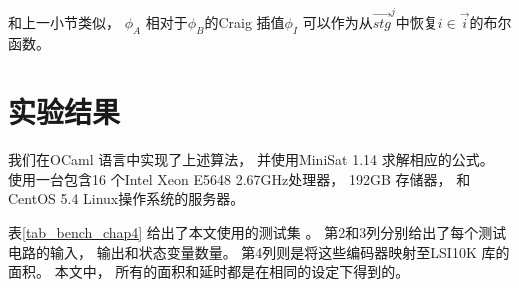 和上一小节类似，
$\phi_A$ 相对于$\phi_B$的Craig 插值$\phi_I$
可以作为从$\vec{stg}^j$中恢复$i\in\vec{i}$的布尔函数。



\section{实验结果}\label{sec_exp_chap4}
我们在OCaml 语言中实现了上述算法，
并使用MiniSat 1.14 求解相应的公式。
使用一台包含16 个Intel Xeon E5648 2.67GHz处理器，
192GB 存储器， 和CentOS 5.4 Linux操作系统的服务器。

表\ref{tab_bench_chap4} 给出了本文使用的测试集 。
第2和3列分别给出了每个测试电路的输入， 输出和状态变量数量。
第4列则是将这些编码器映射至LSI10K 库的面积。
本文中，
所有的面积和延时都是在相同的设定下得到的。



